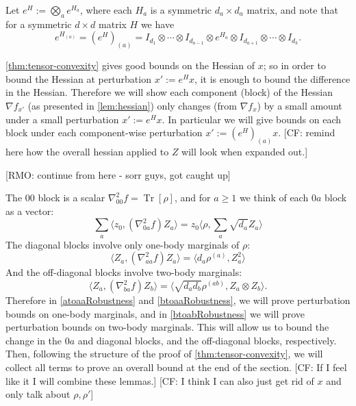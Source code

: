 \documentclass[aos]{imsart}
\theoremstyle{definition}
\numberwithin{equation}{section}
\DeclareMathOperator{\tr}{Tr}
\newcommand{\samp}{x}
\newcommand{\CF}[1]{{\color{purple}[CF: #1]}}
\newcommand{\RMO}[1]{{\color{olive}[RMO: #1]}}
\begin{document}
\begin{appendix}
Let $e^H := \bigotimes_{a} e^{H_a}$, where each $H_a$ is a symmetric $d_a \times d_a$ matrix, and note that for a symmetric $d\times d$ matrix $H$ we have 
$$e^{H_{(a)}}= (e^{H})_{(a)} = I_{d_1} \otimes \cdots \otimes I_{d_{a-1}} \otimes e^{H_a} \otimes I_{d_{a+1}} \otimes \cdots \otimes I_{d_k}.$$

\cref{thm:tensor-convexity} gives good bounds on the Hessian of $\samp$; so in order to bound the Hessian at perturbation $\samp' := e^H \samp$, it is enough to bound the difference in the Hessian.
Therefore we will show each component (block) of the Hessian $\nabla f_{x'}$ (as presented in \cref{lem:hessian}) only changes (from $\nabla f_x$) by a small amount under a small perturbation $x' := e^H x$. 
In particular we will give bounds on each block under each component-wise perturbation $x' := (e^H)_{(a)} x$. \CF{remind here how the overall hessian applied to $Z$ will look when expanded out.}

\RMO{continue from here - sorr guys, got caught up}

\noindent The $00$ block is a scalar $\nabla^{2}_{00} f = \tr[\rho]$, and for $a \geq 1$ we think of each $0a$ block as a vector:
\[ \sum_{a} \langle z_{0}, (\nabla^{2}_{0a} f) Z_{a} \rangle = z_{0} \langle \rho, \sum_{a} \sqrt{d_{a}} Z_{a} \rangle       \]
The diagonal blocks involve only one-body marginals of $\rho$:
\[ \langle Z_{a}, (\nabla^{2}_{aa} f) Z_{a} \rangle = \langle d_{a} \rho^{(a)}, Z_{a}^{2} \rangle       \]
And the off-diagonal blocks involve two-body marginals:
\[ \langle Z_{a}, (\nabla^{2}_{ba} f) Z_{b} \rangle =  \langle \sqrt{d_{a} d_{b}} \rho^{(ab)}, Z_{a} \otimes Z_{b} \rangle.   \]
Therefore in \cref{atoaaRobustness} and \cref{btoaaRobustness}, we will prove perturbation bounds on one-body marginals, and in \cref{btoabRobustness} we will prove perturbation bounds on two-body marginals. This will allow us to bound the change in the $0a$ and diagonal blocks, and the off-diagonal blocks, respectively. Then, following the structure of the proof of \cref{thm:tensor-convexity}, we will collect all terms to prove an overall bound at the end of the section. \CF{If I feel like it I will combine these lemmas.} \CF{I think I can also just get rid of $x$ and only talk about $\rho, \rho'$}



\end{appendix}
\end{document}

